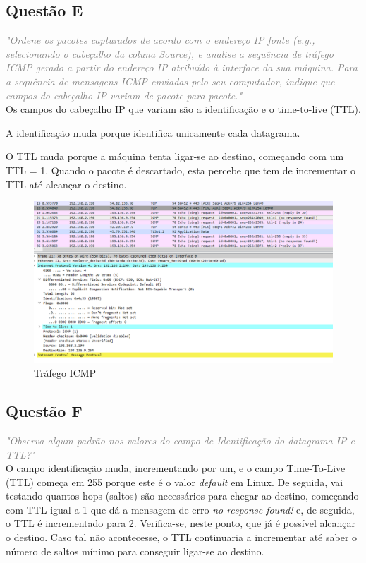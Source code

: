 \documentclass{llncs}
\newcommand{\questionE}[1]{\textcolor{gray}{\textit{"#1"}}}
\begin{document}
\clearpage

\subsection{Questão E}
\hspace{3mm}
\questionE{Ordene os pacotes capturados de acordo com o endereço IP fonte (e.g., selecionando o cabeçalho da coluna \textit{Source}), e analise a sequência de tráfego ICMP gerado a partir do endereço IP atribuído à interface da sua máquina. Para a sequência de mensagens ICMP enviadas pelo seu computador,	indique que campos do cabeçalho IP variam de pacote para pacote.}\\

Os campos do cabeçalho IP que variam são a identificação e o time-to-live (TTL).

A identificação muda porque identifica unicamente cada datagrama.

O TTL muda porque a máquina tenta ligar-se ao destino, começando com um TTL = 1. Quando o pacote é descartado, esta percebe que tem de incrementar o TTL até alcançar o destino. 


\begin{figure}[H]
\begin{center}
\includegraphics[width=12cm]{2ef.PNG}
\end{center}
\caption{Tráfego ICMP}
\end{figure}

\subsection{Questão F}
\hspace{3mm}
\questionE{Observa algum padrão nos valores do campo de Identificação do datagrama IP e TTL?}\\

O campo identificação muda, incrementando por um, e o campo Time-To-Live (TTL) começa em 255 porque este é o valor \textit{default} em Linux. De seguida, vai testando quantos hops (saltos) são necessários para chegar ao destino, começando com  TTL igual a 1 que dá a mensagem de erro \textit{no response found!} e, de seguida, o TTL é incrementado para 2. Verifica-se, neste ponto, que já é possível alcançar o destino. Caso tal não acontecesse, o TTL continuaria a incrementar até saber o número de saltos mínimo para conseguir ligar-se ao destino.
\end{document}
